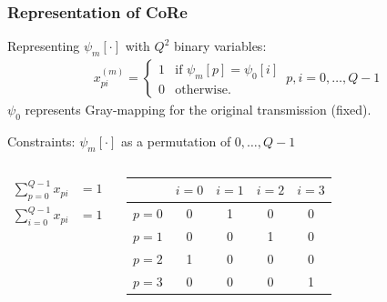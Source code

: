 \documentclass{beamer}
\begin{document}
\begin{frame}
  \frametitle{Representation of CoRe}
  Representing $\psi_m[\cdot]$ with $Q^2$ binary variables:
  \begin{align*}
    x_{pi}^{(m)} = \left\{ \begin{array}{cc}1 & \mbox{if } \psi_m[p] =
    \psi_0[i]\\ 0 & \mbox{otherwise.}\end{array} \right. \,
    p, i = 0,\ldots, Q - 1
  \end{align*}
  $\psi_0$ represents Gray-mapping for the original transmission (fixed).
  \begin{block}{Constraints: $\psi_m[\cdot]$ as a permutation of $0,\ldots, Q -
  1$}
    \begin{columns}
      \begin{align*}
        \sum_{p=0}^{Q-1}x_{pi} & = 1\\
        \sum_{i=0}^{Q-1}x_{pi} & = 1
      \end{align*}
      
      \begin{tabular}{c|cccc}
          \hline
          & $i=0$ & $i=1$ & $i=2$ & $i = 3$\\
          \hline
          $p=0$ & 0 & 1 & 0 & 0 \\
          $p=1$ & 0 & 0 & 1 & 0 \\
          $p=2$ & 1 & 0 & 0 & 0 \\
          $p=3$ & 0 & 0 & 0 & 1 \\
          \hline
      \end{tabular}
    \end{columns}
  \end{block}
\end{frame}
\end{document}
